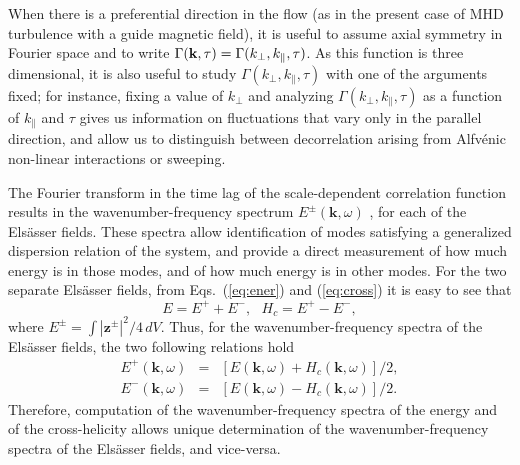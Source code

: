 \documentclass[aip,pop,reprint,amsmath,amssymb,floatfix]{revtex4-1}
\renewcommand{\vec}[1]{\mathbf{#1}}
\begin{document}
When there is a preferential direction in the flow (as in the present
case of MHD turbulence with a guide magnetic field), it is useful to
assume axial symmetry in Fourier space and to write
$\Gamma({\bf k},\tau) = \Gamma(k_\perp,k_\parallel,\tau)$. As this
function is three dimensional, it is also useful to study
$\Gamma(k_\perp,k_\parallel,\tau)$ with one of the arguments fixed;
for instance, fixing a value of $k_\perp$ and analyzing
$\Gamma(k_\perp,k_\parallel,\tau)$ as a function of $k_\parallel$ and
$\tau$ gives us information on fluctuations that vary only in the
parallel direction, and allow us to distinguish between decorrelation
arising from Alfv\'enic non-linear interactions or sweeping.

The Fourier transform in the time lag of the scale-dependent
correlation function results in the wavenumber-frequency spectrum
$E^\pm(\vec{k},\omega)$ \cite{clark_di_leoni_quantification_2014,
  clark_di_leoni_spatio-temporal_2015}, for each of the Els\"asser
fields. These spectra allow identification of modes satisfying a
generalized dispersion relation of the system, and provide a direct
measurement of how much energy is in those modes, and of how much
energy is in other modes. For the two separate Els\"asser fields, from
Eqs.~(\ref{eq:ener}) and (\ref{eq:cross}) it is easy to see that
\begin{equation}
  E = E^+ + E^- , \,\,\,\, H_c = E^+ - E^- ,
\end{equation}
where $E^\pm = \int |\vec{z}^\pm|^2/4 \, dV$. Thus, for the
wavenumber-frequency spectra of the Els\"asser fields, the two
following relations hold
\begin{eqnarray}
  E^+(\vec{k},\omega) &=& [E(\vec{k},\omega) + H_c(\vec{k},\omega)]/2, \\
  E^-(\vec{k},\omega) &=& [E(\vec{k},\omega) - H_c(\vec{k},\omega)]/2.
\end{eqnarray}
Therefore, computation of the wavenumber-frequency spectra of the
energy and of the cross-helicity allows unique determination of the
wavenumber-frequency spectra of the Els\"asser fields, and vice-versa.
\end{document}
